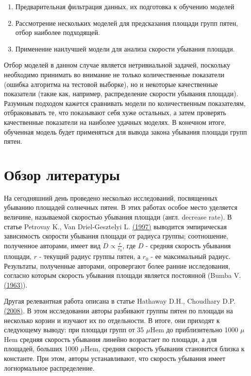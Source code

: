 \documentclass[a4paper, 12pt]{article}
\newcommand{\bibref}[3]{#2 \hyperlink{#1}{\color{blue}(#3)}}
\begin{document}
\begin{enumerate}
    \item Предварительная фильтрация данных, их подготовка к обучению моделей
    \item Рассмотрение нескольких моделей для предсказания площади групп пятен, отбор наиболее подходящей.
    \item Применение наилучшей модели для анализа скорости убывания площади.
\end{enumerate}

Отбор моделей в данном случае является нетривиальной задачей, поскольку необходимо принимать во внимание не только количественные показатели (ошибка алгоритма на тестовой выборке), но и некоторые качественные показатели (такие как, например, распределение скорости убывания площади). Разумным подходом кажется сравнивать модели по количественным показателям, отбраковывать те, что показывают себя хуже остальных, а затем проверять качественные показатели на наиболее удачных моделях. В конечном итоге, обученная модель будет применяться для вывода закона убывания площади групп пятен.

\section{Обзор литературы}

На сегодняшний день проведено несколько исследований, посвященных убыванию площадей солнечных пятен. В этих работах особое место уделяется величине, называемой скоростью убывания площади (англ. decrease rate). В статье \bibref{petrovay}{Petrovay K., Van Driel-Gesztelyi L.}{1997} выводится эмпирическая зависимость скорости убывания площади от радиуса группы; соотношение, полученное авторами, имеет вид $D \propto \frac{r}{r_0}$, где $D$ - средняя скорость убывания площади, $r$ - текущий радиус группы пятен, а $r_0$ - ее максимальный радиус. Результаты, полученные авторами, опровергают более ранние исследования, согласно которым скорость убывания площади является постоянной (\bibref{bumba}{Bumba V.}{1963}).

Другая релевантная работа описана в статье \bibref{hathaway}{Hathaway D.H., Choudhary D.P.}{2008}. В этом исследовании авторы разбивают группы пятен по площади на несколько корзин и изучают их по отдельности. В итоге, они приходят к следующему выводу: при площади групп от 35 $\mu$Hem до приблизительно 1000 $\mu$Hem средняя скорость убывания линейно возрастает по площади, а для площадей, больших 1000 $\mu$Hem, средняя скорость убывания становится близка к константе. При этом, авторы устанавливают, что скорость убывания имеет логнормальное распределение.
\end{document}
